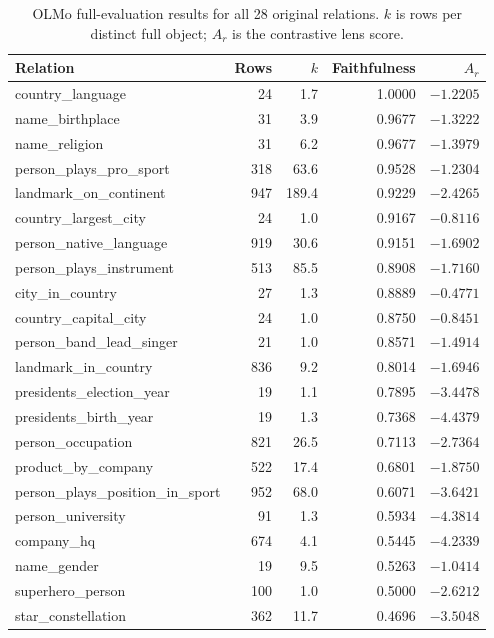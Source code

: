 \begin{table}[t]
\centering\small
\caption{OLMo full-evaluation results for all 28 original relations. $k$ is rows per distinct full object; $A_r$ is the contrastive lens score.}
\label{tab:relations}
\begin{tabular}{@{}lrrrr@{}}
\toprule
Relation & Rows & $k$ & Faithfulness & $A_r$ \\
\midrule
country\_language & 24 & 1.7 & 1.0000 & $-1.2205$ \\
name\_birthplace & 31 & 3.9 & 0.9677 & $-1.3222$ \\
name\_religion & 31 & 6.2 & 0.9677 & $-1.3979$ \\
person\_plays\_pro\_sport & 318 & 63.6 & 0.9528 & $-1.2304$ \\
landmark\_on\_continent & 947 & 189.4 & 0.9229 & $-2.4265$ \\
country\_largest\_city & 24 & 1.0 & 0.9167 & $-0.8116$ \\
person\_native\_language & 919 & 30.6 & 0.9151 & $-1.6902$ \\
person\_plays\_instrument & 513 & 85.5 & 0.8908 & $-1.7160$ \\
city\_in\_country & 27 & 1.3 & 0.8889 & $-0.4771$ \\
country\_capital\_city & 24 & 1.0 & 0.8750 & $-0.8451$ \\
person\_band\_lead\_singer & 21 & 1.0 & 0.8571 & $-1.4914$ \\
landmark\_in\_country & 836 & 9.2 & 0.8014 & $-1.6946$ \\
presidents\_election\_year & 19 & 1.1 & 0.7895 & $-3.4478$ \\
presidents\_birth\_year & 19 & 1.3 & 0.7368 & $-4.4379$ \\
person\_occupation & 821 & 26.5 & 0.7113 & $-2.7364$ \\
product\_by\_company & 522 & 17.4 & 0.6801 & $-1.8750$ \\
person\_plays\_position\_in\_sport & 952 & 68.0 & 0.6071 & $-3.6421$ \\
person\_university & 91 & 1.3 & 0.5934 & $-4.3814$ \\
company\_hq & 674 & 4.1 & 0.5445 & $-4.2339$ \\
name\_gender & 19 & 9.5 & 0.5263 & $-1.0414$ \\
superhero\_person & 100 & 1.0 & 0.5000 & $-2.6212$ \\
star\_constellation & 362 & 11.7 & 0.4696 & $-3.5048$ \\

\end{tabular}
\end{table}
